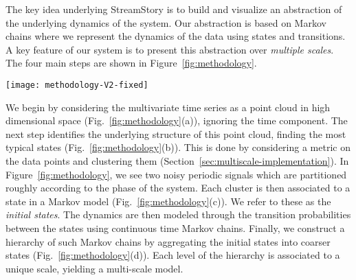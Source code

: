 
The key idea underlying StreamStory is to build and visualize an abstraction of the underlying 
dynamics of the system. Our abstraction is based on Markov chains where we represent the dynamics of the data using states and transitions. A key feature of our system is to present this abstraction over \emph{multiple scales}. 
%
%
The four main steps are shown in Figure~\ref{fig:methodology}.
\begin{figure*}[]
	\centering
	\texttt{[image: methodology-V2-fixed]}
	\caption{Overview of the proposed three-step methodology.}
	\label{fig:methodology}
\end{figure*}
%
We begin by considering the multivariate time series as a point cloud in high dimensional space (Fig.~\ref{fig:methodology}(a)), ignoring the time component. The next step identifies the underlying structure of this point cloud, finding the most typical states (Fig.~\ref{fig:methodology}(b)). This is done by considering a metric on the data points and clustering them (Section~\ref{sec:multiscale-implementation}). In Figure~\ref{fig:methodology}, we see two noisy periodic signals which are partitioned roughly according to the phase of the system. 
Each cluster is then associated to a state in a Markov model (Fig.~\ref{fig:methodology}(c)). We refer to these as the \emph{initial states}. 
The dynamics are then modeled through the transition probabilities between the states using continuous time Markov chains. Finally, we construct a hierarchy of such Markov chains by aggregating the initial states into coarser states (Fig.~\ref{fig:methodology}(d)). Each level of the hierarchy is associated to a unique scale, yielding a multi-scale model.

